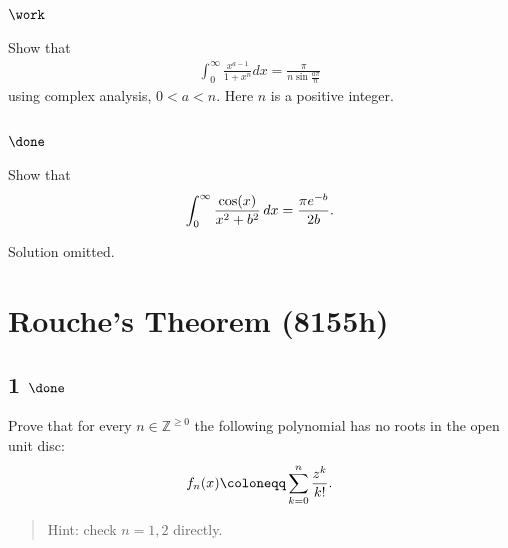 \hypertarget{work-63}{%
\subsection{\texorpdfstring{\(\work\)}{\textbackslash work}}\label{work-63}}

\begin{problem}[?]

Show that
\begin{align*}
\displaystyle \int_0^\infty \frac{x^{a-1}}{1+x^n} dx=\frac{\pi}{n\sin \frac{a\pi}{n}}
\end{align*}
using complex analysis, \(0< a < n\). Here \(n\) is a positive integer.

\end{problem}

\hypertarget{done-8}{%
\subsection{\texorpdfstring{\(\done\)}{\textbackslash done}}\label{done-8}}

\begin{problem}[?]

Show that
\begin{align*}
\int_0^{\infty} {\cos(x) \over x^2 + b^2}\,dx= {\pi e^{-b} \over 2b}
.\end{align*}

\end{problem}

Solution omitted.

\hypertarget{rouches-theorem-8155h}{%
\section{Rouche's Theorem (8155h)}\label{rouches-theorem-8155h}}

\hypertarget{done-9}{%
\subsection{\texorpdfstring{1
\(\done\)}{1 \textbackslash done}}\label{done-9}}

Prove that for every \(n\in {\mathbb{Z}}^{\geq 0}\) the following
polynomial has no roots in the open unit disc:
\begin{align*}
f_n(x) \coloneqq\sum_{k=0}^n {z^k \over k!}
.\end{align*}

\begin{quote}
Hint: check \(n=1,2\) directly.
\end{quote}

